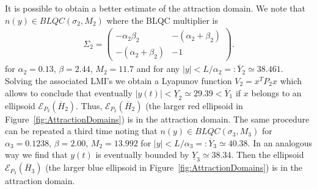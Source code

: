\documentclass[letterpaper,10pt,twocolumn,journal,final]{IEEEtran}
\newcommand{\ellips}{\mathcal{E}}
\begin{document}
It is possible to obtain a better estimate of the attraction domain. We note that $n(y)\in BLQC(\sigma_2,M_2)$ where the BLQC multiplier is
\begin{align}
	\Sigma_2=	\left(\begin{array}{cc}
				-\alpha_2\beta_2 & -(\alpha_2+\beta_2)\\ -(\alpha_2+\beta_2) & -1
			\end{array}\right).
\end{align}
for $\alpha_2=0.13$, $\beta=2.44$, $M_2=11.7$ and for any $|y|<L/\alpha_2=: \overline Y_2 \simeq 38.461$. Solving the associated LMI's we obtain a Lyapunov function $V_2=x^TP_2x$ which allows to conclude that eventually $|y(t)|<\underline Y_2 \simeq 29.39 < \overline Y_1$ if $x$ belongs to an ellipsoid $\ellips_{P_2}(\overline H_2)$.
Thus, $\ellips_{P_2}(\overline H_2)$ (the larger red ellipsoid in Figure~\ref{fig:AttractionDomains}) is in the attraction domain.
The same procedure can be repeated a third time noting that 
$n(y)\in BLQC(\sigma_3,M_3)$ for $\alpha_3=0.1238$, $\beta=2.00$, $M_2=13.992$
for $|y|<L/\alpha_3=: \overline Y_3 \simeq 40.38$. In an analogous way we find that $y(t)$ is eventually bounded by $\underline Y_3 \simeq 38.34$. Then the ellipsoid $\ellips_{P_3}(\overline H_3)$ (the larger blue ellipsoid in Figure~\ref{fig:AttractionDomains}) is in the attraction domain.
\end{document}
